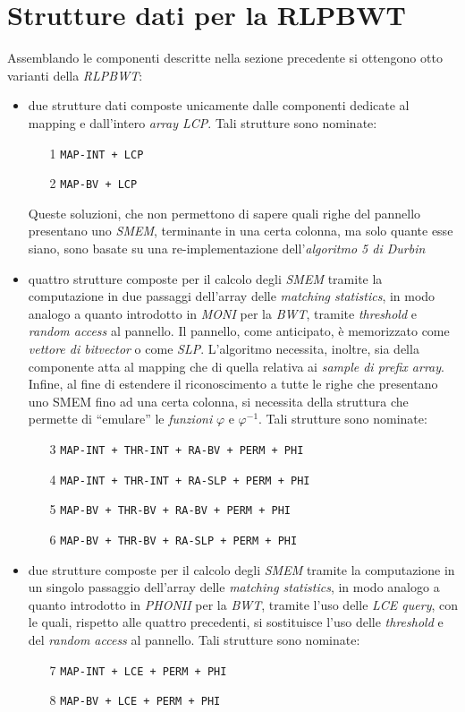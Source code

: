 \section{Strutture dati per la RLPBWT}
Assemblando le componenti descritte nella sezione precedente si ottengono otto
varianti della \textit{RLPBWT}:
\begin{itemize}
  \item due strutture dati composte unicamente dalle componenti dedicate al
  mapping e dall'intero \textit{array LCP}. Tali strutture sono nominate:
  \begin{enumerate}
    \item[1] \texttt{MAP-INT + LCP}
    \item[2] \texttt{MAP-BV + LCP}
  \end{enumerate}
  Queste soluzioni, che non permettono di sapere quali righe del pannello
  presentano uno \textit{SMEM}, terminante in una certa colonna, ma solo quante
  esse siano, sono basate su una re-implementazione dell'\textit{algoritmo 5 di
    Durbin}
  \item quattro strutture composte per il calcolo degli \textit{SMEM} tramite la
  computazione 
  in due passaggi dell'array delle \textit{matching statistics}, in modo analogo
  a quanto introdotto in \textit{MONI} per la \textit{BWT}, tramite
  \textit{threshold} e \textit{random access} al pannello. Il pannello, come
  anticipato, è memorizzato come \textit{vettore di bitvector} o come
  \textit{SLP}. L'algoritmo  
  necessita, inoltre, sia della componente atta al mapping che di quella
  relativa ai \textit{sample di prefix array}. Infine, al fine di estendere il
  riconoscimento a tutte le righe che presentano uno SMEM fino ad una certa
  colonna, si necessita della struttura che permette di ``emulare'' le
  \textit{funzioni} $\varphi$ e $\varphi^{-1}$. Tali strutture sono nominate:
  \begin{enumerate}
    \item[3] \texttt{MAP-INT + THR-INT + RA-BV + PERM + PHI}
    \item[4] \texttt{MAP-INT + THR-INT + RA-SLP + PERM + PHI}
    \item[5] \texttt{MAP-BV + THR-BV + RA-BV + PERM + PHI}
    \item[6] \texttt{MAP-BV + THR-BV + RA-SLP + PERM + PHI}
  \end{enumerate}
  \item due strutture composte per il calcolo degli \textit{SMEM} tramite la
  computazione 
  in un singolo passaggio dell'array delle \textit{matching statistics}, in modo
  analogo a quanto introdotto in \textit{PHONII} per la \textit{BWT}, tramite
  l'uso delle \textit{LCE query}, con le quali, rispetto alle quattro
  precedenti, si sostituisce l'uso delle \textit{threshold} e del \textit{random
    access} al pannello. Tali strutture sono nominate:
  \begin{enumerate}
    \item[7] \texttt{MAP-INT + LCE + PERM + PHI}
    \item[8] \texttt{MAP-BV + LCE + PERM + PHI}
  \end{enumerate}
\end{itemize}
